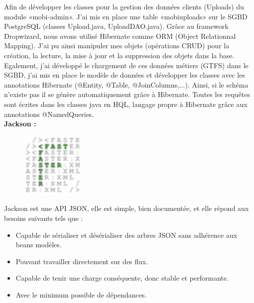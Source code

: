 \begin{itemize}
Afin de développer les classes pour la gestion des données clients (Uploads) du module «mobi-admin». J'ai mis en place une table «mobiuploads» sur le SGBD PostgreSQL (classes Upload.java, UploadDAO.java).
Grâce au framework Dropwizard, nous avons utilisé Hibernate comme ORM (Object Relationnal Mapping). J'ai pu ainsi manipuler mes objets (opérations CRUD) pour la création, la lecture, la mise à jour et la suppression des objets dans la base. 
Egalement, j'ai développé le chargement de ces données métiers (GTFS) dans le SGBD, j'ai mis en place le modèle de données et développer les classes avec les annotations Hibernate (@Entity, @Table, @JoinColumns,...). Ainsi, si le schéma n'existe pas il se génère automatiquement grâce à Hibernate. 
Toutes les requêtes sont écrites dans les classes java en HQL, langage propre à Hibernate grâce aux annotations @NamedQueries. \\


\textbf{Jackson :}

\begin{figure}
\centering
\includegraphics[width=3cm]{images/fxml_logo_Jackson.png}
\end{figure}
\noindent Jackson est une API JSON, elle est simple, bien documentée, et elle répond aux besoins suivants tels que :
\begin{itemize}
\item Capable de sérialiser et désérialiser des arbres JSON sans adhérence aux beans modèles.
\item Pouvant travailler directement sur des flux.
\item Capable de tenir une charge conséquente, donc stable et performante.
\item Avec le minimum possible de dépendances.
\end{itemize}


\end{itemize}
